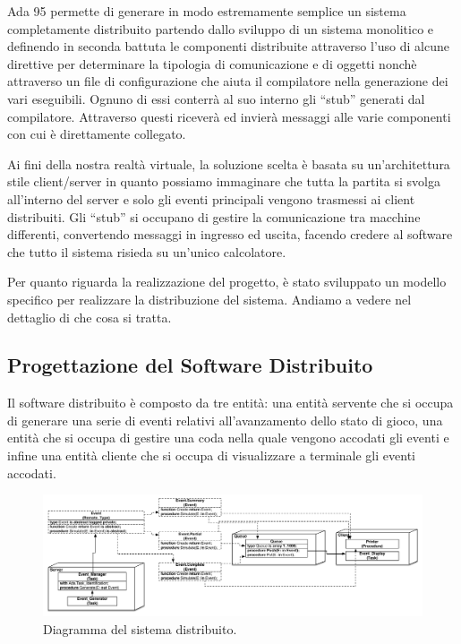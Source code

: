 \documentclass[aps,letterpaper,10pt]{article}
\begin{document}
Ada 95 permette di generare in modo estremamente semplice un sistema completamente distribuito partendo dallo sviluppo di un sistema monolitico e definendo in seconda battuta le componenti distribuite attraverso l'uso di alcune direttive per determinare la tipologia di comunicazione e di oggetti nonch\`e attraverso un file di configurazione che aiuta il compilatore nella generazione dei vari eseguibili. Ognuno di essi conterr\`a al suo interno gli ``stub'' generati dal compilatore. Attraverso questi ricever\`a ed invier\`a messaggi alle varie componenti con cui \`e direttamente collegato. \vspace{3mm}

Ai fini della nostra realt\`a virtuale, la soluzione scelta \`e basata su un'architettura stile client/server in quanto possiamo immaginare che tutta la partita si svolga all'interno del server e solo gli eventi principali vengono trasmessi ai client distribuiti. Gli ``stub'' si occupano di gestire la comunicazione tra macchine differenti, convertendo messaggi in ingresso ed uscita, facendo credere al software che tutto il sistema risieda su un'unico calcolatore. \vspace{3mm}

Per quanto riguarda la realizzazione del progetto, \`e stato sviluppato un modello specifico per realizzare la distribuzione del sistema. Andiamo a vedere nel dettaglio di che cosa si tratta.

\subsection{Progettazione del Software Distribuito}

Il software distribuito \`e composto da tre entit\`a: una entit\`a servente che si occupa di generare una serie di eventi relativi all'avanzamento dello stato di gioco, una entit\`a che si occupa di gestire una coda nella quale vengono accodati gli eventi e infine una entit\`a cliente che si occupa di visualizzare a terminale gli eventi accodati. \vspace{3mm}

\begin{figure}[H]
	\begin{center}
		\includegraphics[width=450px]{images/distributed-system.pdf}
	\end{center}
\caption{Diagramma del sistema distribuito.}
\end{figure}
\end{document}
